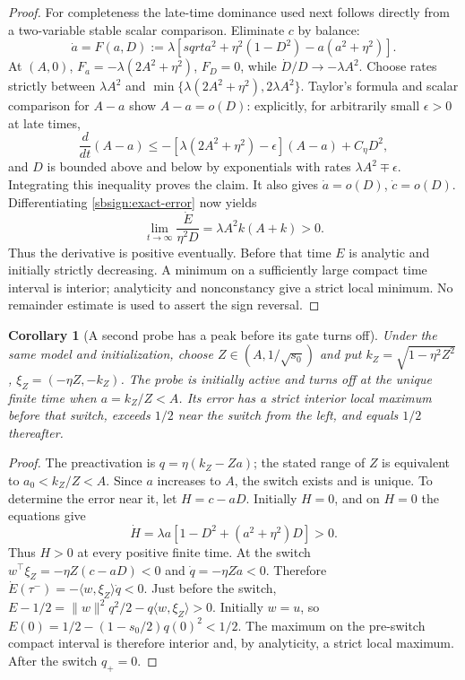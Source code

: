 \documentclass{article} %
\theoremstyle{plain}
\newtheorem{corollary}[theorem]{Corollary}
\theoremstyle{definition}
\theoremstyle{remark}
\begin{document}
\begin{proof}
For completeness the late-time dominance used next follows directly
from a two-variable stable scalar comparison. Eliminate $c$ by balance:
\[
 \dot a=F(a,D):=\lambda[sqrt{a^2+\eta^2(1-D^2)}-a(a^2+\eta^2)].
\]
At $(A,0)$, $F_a=-\lambda(2A^2+\eta^2)$, $F_D=0$, while
$\dot D/D\to-\lambda A^2$. Choose rates strictly between
$\lambda A^2$ and $\min\{\lambda(2A^2+\eta^2),2\lambda A^2\}$.
Taylor's formula and scalar comparison for $A-a$ show
$A-a=o(D)$: explicitly, for arbitrarily small $\epsilon>0$ at late times,
\[
 \frac{d}{dt}(A-a)\le-[\lambda(2A^2+\eta^2)-\epsilon](A-a)+C_\eta D^2,
\]
and $D$ is bounded above and below by exponentials with rates
$\lambda A^2\mp\epsilon$. Integrating this inequality proves the claim.
It also gives $\dot a=o(D)$, $\dot c=o(D)$.
Differentiating \eqref{sbsign:exact-error} now yields
\[
 \lim_{t\to\infty}\frac{\dot E}{\eta^2D}
       =\lambda A^2 k(A+k)>0.
\]
Thus the derivative is positive eventually. Before that time $E$ is
analytic and initially strictly decreasing. A minimum on a sufficiently
large compact time interval is interior; analyticity and nonconstancy
give a strict local minimum. No remainder estimate is used to assert
the sign reversal.
\end{proof}

\begin{corollary}[A second probe has a peak before its gate turns off]
\label{sbsign:switch-peak}
Under the same model and initialization, choose
$Z\in(A,1/\sqrt{s_0})$ and put
$k_Z=\sqrt{1-\eta^2Z^2}$, $\xi_Z=(-\eta Z,-k_Z)$.
The probe is initially active and turns off at the unique finite time
when $a=k_Z/Z<A$. Its error has a strict interior local maximum before
that switch, exceeds $1/2$ near the switch from the left, and equals
$1/2$ thereafter.
\end{corollary}
\begin{proof}
The preactivation is $q=\eta(k_Z-Za)$; the stated range of $Z$ is
equivalent to $a_0<k_Z/Z<A$. Since $a$ increases to $A$, the switch
exists and is unique. To determine the error near it, let $H=c-aD$.
Initially $H=0$, and on $H=0$ the equations give
\[
 \dot H=\lambda a[1-D^2+(a^2+\eta^2)D]>0.
\]
Thus $H>0$ at every positive finite time.
At the switch $w^\top\xi_Z=-\eta Z(c-aD)<0$ and
$\dot q=-\eta Z\dot a<0$. Therefore
$\dot E(\tau^-)=-\langle w,\xi_Z\rangle\dot q<0$.
Just before the switch,
$E-1/2=\|w\|^2q^2/2-q\langle w,\xi_Z\rangle>0$.
Initially $w=u$, so
$E(0)=1/2-(1-s_0/2)q(0)^2<1/2$.
The maximum on the pre-switch compact interval is therefore interior
and, by analyticity, a strict local maximum. After the switch $q_+=0$.
\end{proof}
\end{document}
